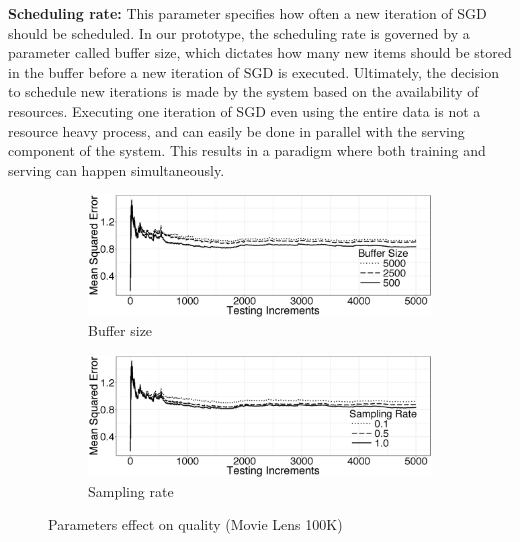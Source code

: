 \documentclass{vldb}
\begin{document}
\textbf{Scheduling rate:} This parameter specifies how often a new iteration of SGD should be scheduled. 
In our prototype, the scheduling rate is governed by a parameter called buffer size, which dictates how many new items should be stored in the buffer before a new iteration of SGD is executed. 
Ultimately, the decision to schedule new iterations is made by the system based on the availability of resources. 
Executing one iteration of SGD even using the entire data is not a resource heavy process, and can easily be done in parallel with the serving component of the system. 
This results in a paradigm where both training and serving can happen simultaneously. 

\begin{figure}[h]
\begin{subfigure}{\columnwidth}
\centering
\includegraphics[width=\columnwidth]{../images/experiment-results/movie-lens-buffer-quality-improved.eps}
\caption{Buffer size}
\label{fig:movie-lens-100k-buffer-size-mse}
\end{subfigure}
\begin{subfigure}{\columnwidth}
\centering
\includegraphics[width=\columnwidth]{../images/experiment-results/movie-lens-sampling-quality-improved.eps}
\caption{Sampling rate}
\label{fig:movie-lens-100k-sample-rate}
\end{subfigure}
\caption{Parameters effect on quality (Movie Lens 100K)}
\end{figure}
\end{document}
